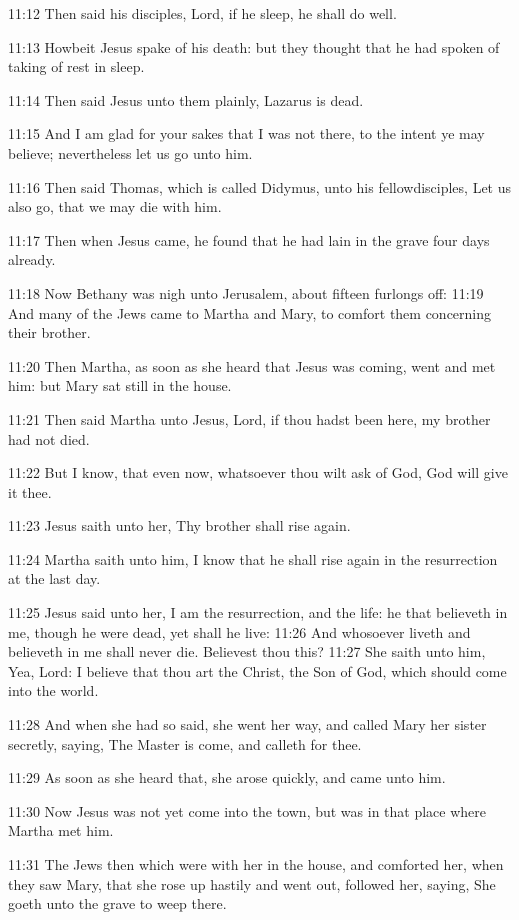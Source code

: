 11:12 Then said his disciples, Lord, if he sleep, he shall do well.

11:13 Howbeit Jesus spake of his death: but they thought that he had
spoken of taking of rest in sleep.

11:14 Then said Jesus unto them plainly, Lazarus is dead.

11:15 And I am glad for your sakes that I was not there, to the intent
ye may believe; nevertheless let us go unto him.

11:16 Then said Thomas, which is called Didymus, unto his
fellowdisciples, Let us also go, that we may die with him.

11:17 Then when Jesus came, he found that he had lain in the grave
four days already.

11:18 Now Bethany was nigh unto Jerusalem, about fifteen furlongs off:
11:19 And many of the Jews came to Martha and Mary, to comfort them
concerning their brother.

11:20 Then Martha, as soon as she heard that Jesus was coming, went
and met him: but Mary sat still in the house.

11:21 Then said Martha unto Jesus, Lord, if thou hadst been here, my
brother had not died.

11:22 But I know, that even now, whatsoever thou wilt ask of God, God
will give it thee.

11:23 Jesus saith unto her, Thy brother shall rise again.

11:24 Martha saith unto him, I know that he shall rise again in the
resurrection at the last day.

11:25 Jesus said unto her, I am the resurrection, and the life: he
that believeth in me, though he were dead, yet shall he live: 11:26
And whosoever liveth and believeth in me shall never die. Believest
thou this?  11:27 She saith unto him, Yea, Lord: I believe that thou
art the Christ, the Son of God, which should come into the world.

11:28 And when she had so said, she went her way, and called Mary her
sister secretly, saying, The Master is come, and calleth for thee.

11:29 As soon as she heard that, she arose quickly, and came unto him.

11:30 Now Jesus was not yet come into the town, but was in that place
where Martha met him.

11:31 The Jews then which were with her in the house, and comforted
her, when they saw Mary, that she rose up hastily and went out,
followed her, saying, She goeth unto the grave to weep there.

